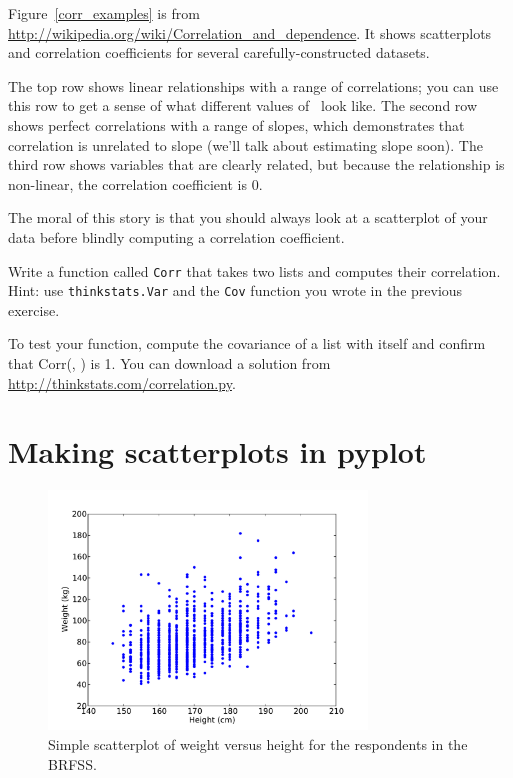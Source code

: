 \documentclass[12pt]{book}
\begin{document}
Figure~\ref{corr_examples} is from
\url{http://wikipedia.org/wiki/Correlation_and_dependence}.  It shows
scatterplots and correlation coefficients for several
carefully-constructed datasets.

The top row shows linear relationships with a range of correlations;
you can use this row to get a sense of what different values of
\myrho~look like.  The second row shows perfect correlations with a
range of slopes, which demonstrates that correlation is unrelated to
slope (we'll talk about estimating slope soon).  The third row shows
variables that are clearly related, but because the relationship is
non-linear, the correlation coefficient is 0.

The moral of this story is that you should always look at a scatterplot of
your data before blindly computing a correlation coefficient.

\begin{exercise}
Write a function called {\tt Corr} that takes two lists and
computes their correlation.  Hint: use {\tt thinkstats.Var} and
the {\tt Cov} function you wrote in the previous exercise.

To test your function, compute the covariance of a list with itself
and confirm that Corr(\X, \X) is 1.  You can download a solution
from \url{http://thinkstats.com/correlation.py}.

\end{exercise}


\section{Making scatterplots in pyplot}

\begin{figure}
\centerline{\includegraphics[height=2.5in]{figs/scatter1.pdf}}
\caption{Simple scatterplot of weight versus height for the respondents
in the BRFSS.}
\label{scatterplot1}
\end{figure}
\end{document}
